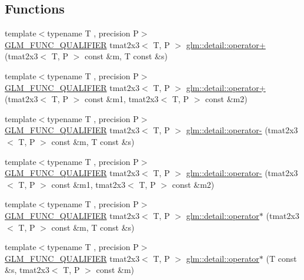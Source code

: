 \subsection*{Functions}
\begin{DoxyCompactItemize}
\item 
{\footnotesize template$<$typename T , precision P$>$ }\\\hyperlink{setup_8hpp_a33fdea6f91c5f834105f7415e2a64407}{G\+L\+M\+\_\+\+F\+U\+N\+C\+\_\+\+Q\+U\+A\+L\+I\+F\+I\+ER} tmat2x3$<$ T, P $>$ \hyperlink{namespaceglm_1_1detail_ada87c05a6cb1f52ed0d5b8b3b58233fd}{glm\+::detail\+::operator+} (tmat2x3$<$ T, P $>$ const \&m, T const \&s)
\item 
{\footnotesize template$<$typename T , precision P$>$ }\\\hyperlink{setup_8hpp_a33fdea6f91c5f834105f7415e2a64407}{G\+L\+M\+\_\+\+F\+U\+N\+C\+\_\+\+Q\+U\+A\+L\+I\+F\+I\+ER} tmat2x3$<$ T, P $>$ \hyperlink{namespaceglm_1_1detail_acfeb50dfcb1f110eb73c0af1bd4aa5d3}{glm\+::detail\+::operator+} (tmat2x3$<$ T, P $>$ const \&m1, tmat2x3$<$ T, P $>$ const \&m2)
\item 
{\footnotesize template$<$typename T , precision P$>$ }\\\hyperlink{setup_8hpp_a33fdea6f91c5f834105f7415e2a64407}{G\+L\+M\+\_\+\+F\+U\+N\+C\+\_\+\+Q\+U\+A\+L\+I\+F\+I\+ER} tmat2x3$<$ T, P $>$ \hyperlink{namespaceglm_1_1detail_a3b075a76129005663f356a1d79875ce0}{glm\+::detail\+::operator-\/} (tmat2x3$<$ T, P $>$ const \&m, T const \&s)
\item 
{\footnotesize template$<$typename T , precision P$>$ }\\\hyperlink{setup_8hpp_a33fdea6f91c5f834105f7415e2a64407}{G\+L\+M\+\_\+\+F\+U\+N\+C\+\_\+\+Q\+U\+A\+L\+I\+F\+I\+ER} tmat2x3$<$ T, P $>$ \hyperlink{namespaceglm_1_1detail_a4fddde773e38a278b6f7916e35873b1c}{glm\+::detail\+::operator-\/} (tmat2x3$<$ T, P $>$ const \&m1, tmat2x3$<$ T, P $>$ const \&m2)
\item 
{\footnotesize template$<$typename T , precision P$>$ }\\\hyperlink{setup_8hpp_a33fdea6f91c5f834105f7415e2a64407}{G\+L\+M\+\_\+\+F\+U\+N\+C\+\_\+\+Q\+U\+A\+L\+I\+F\+I\+ER} tmat2x3$<$ T, P $>$ \hyperlink{namespaceglm_1_1detail_ad0a174cb7c2a222a8da95d5bdf51d0e9}{glm\+::detail\+::operator$\ast$} (tmat2x3$<$ T, P $>$ const \&m, T const \&s)
\item 
{\footnotesize template$<$typename T , precision P$>$ }\\\hyperlink{setup_8hpp_a33fdea6f91c5f834105f7415e2a64407}{G\+L\+M\+\_\+\+F\+U\+N\+C\+\_\+\+Q\+U\+A\+L\+I\+F\+I\+ER} tmat2x3$<$ T, P $>$ \hyperlink{namespaceglm_1_1detail_a811c1717a6f94d35aa6893fd6028b424}{glm\+::detail\+::operator$\ast$} (T const \&s, tmat2x3$<$ T, P $>$ const \&m)

\end{DoxyCompactItemize}
